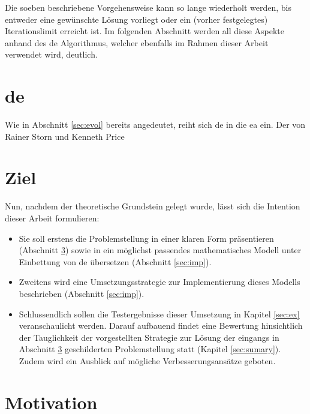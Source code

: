 		Die soeben beschriebene Vorgehensweise kann so lange wiederholt werden, 
		bis entweder eine gewünschte Lösung vorliegt oder ein (vorher 
		festgelegtes) Iterationslimit erreicht ist. Im folgenden Abschnitt 
		werden all diese Aspekte anhand des \gls{de} Algorithmus, welcher 
		ebenfalls im Rahmen dieser Arbeit verwendet wird, deutlich.\\
		
	
	\section{\gls{de}}
	\label{sec:de}
	
	Wie in Abschnitt \ref{sec:evol} bereits angedeutet, reiht sich \gls{de} in 
	die \gls{ea} ein. Der von Rainer Storn und Kenneth Price 
	\cite{storn-price-de} 
	
	\section{Ziel}
	\label{sec:ziel}
	
		Nun, nachdem der theoretische Grundstein gelegt wurde, lässt sich die Intention dieser Arbeit formulieren:
		\begin{itemize}
			\item Sie soll erstens die Problemstellung in einer klaren Form präsentieren (Abschnitt \ref{sec:motivation}) sowie in ein möglichst passendes mathematisches Modell unter Einbettung von \gls{de} übersetzen (Abschnitt \ref{sec:imp}).
			\item Zweitens wird eine Umsetzungsstrategie zur Implementierung dieses Modells beschrieben (Abschnitt \ref{sec:imp}).
			\item Schlussendlich sollen die Testergebnisse dieser Umsetzung in Kapitel \ref{sec:ex} veranschaulicht werden. Darauf aufbauend findet eine Bewertung hinsichtlich der Tauglichkeit der vorgestellten Strategie zur Lösung der eingangs in Abschnitt \ref{sec:motivation} geschilderten Problemstellung statt (Kapitel \ref{sec:sumary}). Zudem wird ein Ausblick auf mögliche Verbesserungsansätze geboten. 
		\end{itemize}
	
	\section{Motivation}
	\label{sec:motivation}